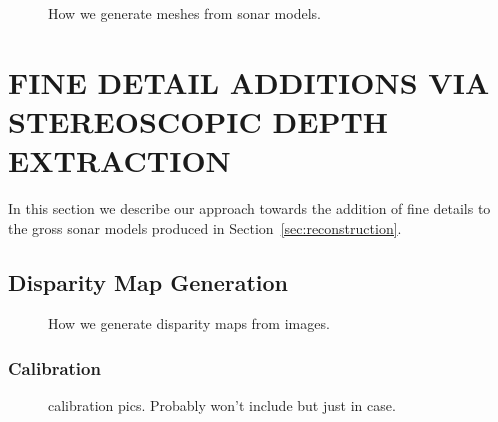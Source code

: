 \documentclass[a4paper,twoside]{article}
\begin{document}
\begin{figure*}[!ht]
   \vspace{-0.2cm}
   \caption{How we generate meshes from sonar models.}
  \label{fig:meshgen}
 \end{figure*}

\section{\uppercase{Fine Detail Additions Via Stereoscopic Depth Extraction}}
\label{sec:detail}

\noindent In this section we describe our approach towards the addition of fine details to the gross sonar models produced in Section~\ref{sec:reconstruction}. 


\subsection{Disparity Map Generation}


\noindent

\begin{figure*}[!ht]
   \vspace{-0.2cm}
   \caption{How we generate disparity maps from images.}
  \label{fig:dispgen}
 \end{figure*}

\subsubsection{Calibration}
\label{subsec:calibration}


\begin{figure}[!h]
	\centering
		\quad %
		\caption{calibration pics. Probably won't include but just in case.}
		\label{calibrate}
\end{figure}
\end{document}
